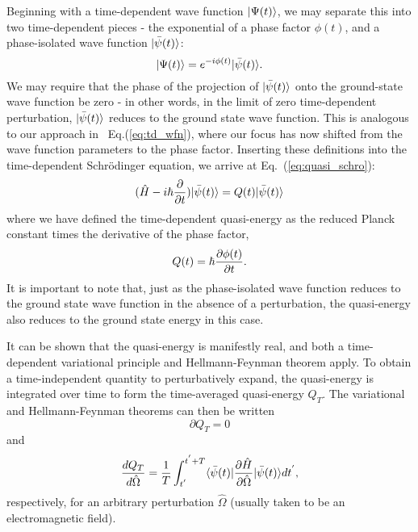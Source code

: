 {{{Beginning with a time-dependent wave function $| \Psi(t) \rangle$, we may separate this into two time-dependent pieces - the exponential of a phase factor $\phi(t)$, and a phase-isolated wave function $| \bar\psi(t) \rangle$:
\begin{equation} \label{total_psi}
    | \Psi(t) \rangle = e^{-i\phi(t)}| \bar\psi(t) \rangle.
\end{equation}
We may require that the phase of the projection of $| \bar\psi(t) \rangle$ onto the ground-state wave function be 
zero - in other words, in the limit of zero time-dependent perturbation, $| \bar\psi(t) \rangle$ reduces to the
ground state wave function. This is analogous to our approach in ~Eq.(\ref{eq:td_wfn}), where our focus has
now shifted from the wave function parameters to the phase factor.
Inserting these definitions into the time-dependent Schr\"odinger equation,
we arrive at Eq.~(\ref{eq:quasi_schro}):
\begin{equation} \label{eq:quasi_schro}
    (\hat{H} - i\hbar \frac{\partial}{\partial t})| \bar\psi(t) \rangle = Q(t)| \bar\psi(t) \rangle
\end{equation}
where we have defined the time-dependent quasi-energy as the reduced Planck constant times the derivative
of the phase factor,
\begin{equation} \label{eq:quasi_e}
    Q(t) = \hbar\frac{\partial\phi(t)}{\partial t}.
\end{equation}
It is important to note that, just as the phase-isolated wave function reduces to the ground state wave function in the absence of a perturbation, the quasi-energy also reduces to the ground state energy in this case. 

It can be shown that the quasi-energy is manifestly real, and both a time-dependent variational principle and Hellmann-Feynman theorem apply. To obtain a time-independent quantity to perturbatively expand, the quasi-energy is integrated over time to form the time-averaged quasi-energy $Q_T$. The variational and Hellmann-Feynman theorems can then be written
\begin{equation} \label{eq:var}
    \partial Q_T = 0
\end{equation}
and
\begin{equation} \label{eq:hf-theorem}
    \frac{dQ_T}{d\hat\Omega} = \frac{1}{T}\int_{t^{'}}^{t^{'}+T}\langle\bar\psi(t) |\frac{\partial \hat{H}}{\partial\hat\Omega}| \bar\psi(t) \rangle dt^{'},
\end{equation}
respectively, for an arbitrary perturbation $\hat\Omega$ (usually taken to be an electromagnetic field).

}}}
